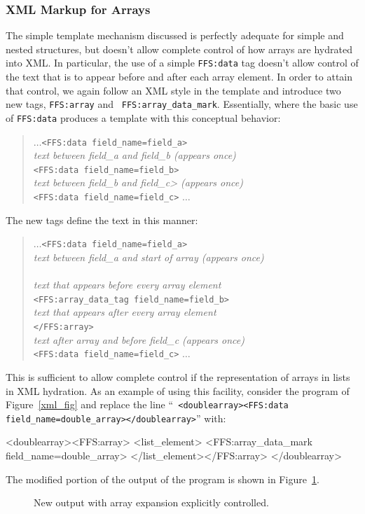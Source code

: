 \subsubsection{XML Markup for Arrays}
The simple template mechanism discussed is perfectly adequate for simple
and nested structures, but doesn't allow complete control of how arrays are
hydrated into XML.  In particular, the use of a simple {\tt FFS:data} tag
doesn't allow control of the text that is to appear before and after each
array element.  In order to attain that control, we again follow an XML
style in the template and introduce two new tags, {\tt FFS:array} and {\tt
FFS:array\_data\_mark}.  Essentially, where the basic use of {\tt FFS:data}
produces a template with this conceptual behavior:
\begin{quote}
\small
$\dots${\tt <FFS:data field\_name=field\_a>}\\
{\it text between field\_a and field\_b (appears once)}\\
{\tt <FFS:data field\_name=field\_b>}\\
{\it text between field\_b and field\_c> (appears once)}\\
{\tt <FFS:data field\_name=field\_c>}
$\dots$
\end{quote}
The new tags define the text in this manner:
\begin{quote}
\small
$\dots${\tt <FFS:data field\_name=field\_a>}\\
{\it text between field\_a and start of array (appears once)}\\
{\tt <FFS:array>}\\
{\it text that appears before every array element}\\
{\tt <FFS:array\_data\_tag field\_name=field\_b>}\\
{\it text that appears after every array element}\\
{\tt </FFS:array>}\\
{\it text after array and before field\_c (appears once)}\\
{\tt <FFS:data field\_name=field\_c>}
$\dots$
\end{quote}
This is sufficient to allow complete control if the representation of arrays in
lists in XML hydration.  As an example of using this facility, consider the
program of Figure~\ref{xml_fig} and replace the line ``{\tt
<doublearray><FFS:data field\_name=double\_array></doublearray>}'' with:
\begin{Code}
	<doublearray><FFS:array>
	    <list_element>
		<FFS:array_data_mark field_name=double_array>
	    </list_element></FFS:array>
	</doublearray>
\end{Code}
The modified portion of the  output of the program is shown in Figure~\ref{xml_output2}.
\begin{figure}[t]
\caption{New output with array expansion explicitly controlled.\label{xml_output2}}
\end{figure}


